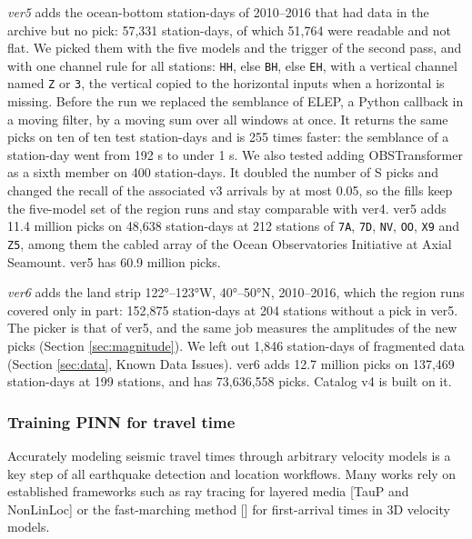 \documentclass[review]{seismica}
\begin{document}
\emph{ver5} adds the ocean-bottom station-days of 2010--2016 that had
data in the archive but no pick: 57,331 station-days, of which 51,764
were readable and not flat. We picked them with the five models and the
trigger of the second pass, and with one channel rule for all stations:
\texttt{HH}, else \texttt{BH}, else \texttt{EH}, with a vertical channel
named \texttt{Z} or \texttt{3}, the vertical copied to the horizontal
inputs when a horizontal is missing. Before the run we replaced the
semblance of ELEP, a Python callback in a moving filter, by a moving sum
over all windows at once. It returns the same picks on ten of ten test
station-days and is 255 times faster: the semblance of a station-day
went from 192 s to under 1 s. We also tested adding OBSTransformer
\citep{niksejel2024obstransformer} as a sixth member on 400
station-days. It doubled the number of S picks and changed the recall of
the associated v3 arrivals by at most 0.05, so the fills keep the
five-model set of the region runs and stay comparable with ver4. ver5
adds 11.4 million picks on 48,638 station-days at 212 stations of
\texttt{7A}, \texttt{7D}, \texttt{NV}, \texttt{OO}, \texttt{X9} and
\texttt{Z5}, among them the cabled array of the Ocean Observatories
Initiative at Axial Seamount. ver5 has 60.9 million picks.

\emph{ver6} adds the land strip 122°--123°W, 40°--50°N, 2010--2016,
which the region runs covered only in part: 152,875 station-days at 204
stations without a pick in ver5. The picker is that of ver5, and the
same job measures the amplitudes of the new picks (Section
\ref{sec:magnitude}). We left out 1,846 station-days of fragmented data
(Section \ref{sec:data}, Known Data Issues). ver6 adds 12.7 million
picks on 137,469 station-days at 199 stations, and has 73,636,558 picks.
Catalog v4 is built on it.

\subsubsection{Training PINN for travel
time}\label{training-pinn-for-travel-time}

Accurately modeling seismic travel times through arbitrary velocity
models is a key step of all earthquake detection and location workflows.
Many works rely on established frameworks such as ray tracing for
layered media {[}TauP and NonLinLoc{]} or the fast-marching method
{[}{]} for first-arrival times in 3D velocity models.
\end{document}
